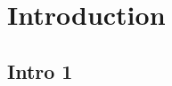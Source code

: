 \chapter{Introduction}
\label{c:intro}

\lipsum[1-3]

\section{Intro 1}%
\label{sec:intro_1}

\lipsum[4]



